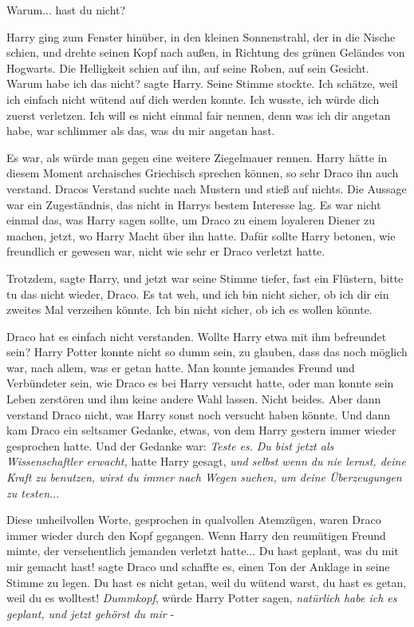 \glqq{}Warum... hast du nicht?\grqq{}

Harry ging zum Fenster hinüber, in den kleinen Sonnenstrahl, der in die Nische
schien, und drehte seinen Kopf nach außen, in Richtung des grünen Geländes von
Hogwarts. Die Helligkeit schien auf ihn, auf seine Roben, auf sein Gesicht.
\glqq{}Warum habe ich das nicht?\grqq{} sagte Harry. Seine Stimme stockte. \glqq
Ich schätze, weil ich einfach nicht wütend auf dich werden konnte. Ich wusste,
ich würde dich zuerst verletzen. Ich will es nicht einmal fair nennen, denn was
ich dir angetan habe, war schlimmer als das, was du mir angetan hast.\grqq{}

Es war, als würde man gegen eine weitere Ziegelmauer rennen. Harry hätte in
diesem Moment archaisches Griechisch sprechen können, so sehr Draco ihn auch
verstand. Dracos Verstand suchte nach Mustern und stieß auf nichts. Die Aussage
war ein Zugeständnis, das nicht in Harrys bestem Interesse lag. Es war nicht
einmal das, was Harry sagen sollte, um Draco zu einem loyaleren Diener zu
machen, jetzt, wo Harry Macht über ihn hatte. Dafür sollte Harry betonen, wie
freundlich er gewesen war, nicht wie sehr er Draco verletzt hatte.

\glqq{}Trotzdem\grqq{}, sagte Harry, und jetzt war seine Stimme tiefer, fast ein
Flüstern, \glqq{}bitte tu das nicht wieder, Draco. Es tat weh, und ich bin nicht
sicher, ob ich dir ein zweites Mal verzeihen könnte. Ich bin nicht sicher, ob
ich es wollen könnte.\grqq{}

Draco hat es einfach nicht verstanden. Wollte Harry etwa mit ihm befreundet
sein? Harry Potter konnte nicht so dumm sein, zu glauben, dass das noch möglich
war, nach allem, was er getan hatte. Man konnte jemandes Freund und Verbündeter
sein, wie Draco es bei Harry versucht hatte, oder man konnte sein Leben
zerstören und ihm keine andere Wahl lassen. Nicht beides. Aber dann verstand
Draco nicht, was Harry sonst noch versucht haben könnte. Und dann kam Draco ein
seltsamer Gedanke, etwas, von dem Harry gestern immer wieder gesprochen hatte.
Und der Gedanke war: \emph{Teste es.} \emph{Du bist jetzt als Wissenschaftler
erwacht,} hatte Harry gesagt, \emph{und selbst wenn du nie lernst, deine Kraft
zu benutzen, wirst du immer nach Wegen suchen, um deine Überzeugungen zu
testen.}..

Diese unheilvollen Worte, gesprochen in qualvollen Atemzügen, waren Draco immer
wieder durch den Kopf gegangen. Wenn Harry den reumütigen Freund mimte, der
versehentlich jemanden verletzt hatte... \glqq{}Du hast geplant, was du mit mir
gemacht hast!\grqq{} sagte Draco und schaffte es, einen Ton der Anklage in seine
Stimme zu legen. \glqq{}Du hast es nicht getan, weil du wütend warst, du hast es
getan, weil du es wolltest!\grqq{} \emph{Dummkopf}, würde Harry Potter sagen,
\emph{natürlich habe ich es geplant, und jetzt gehörst du mir} -

